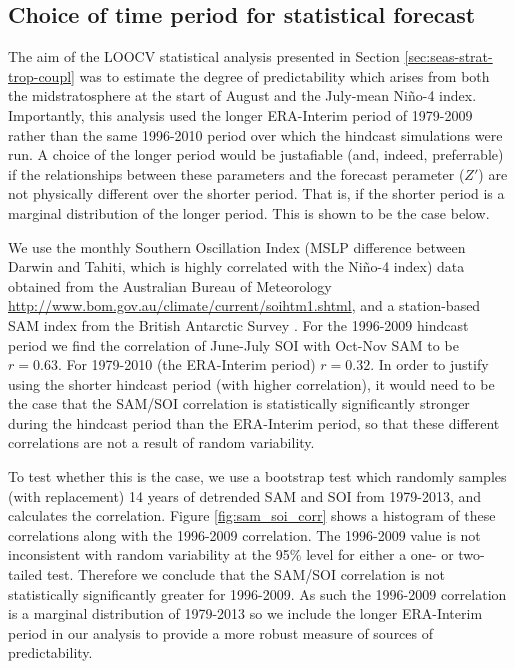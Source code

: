 \begin{subappendices}
\section{Choice of time period for statistical forecast}
\label{sec:app-choice-time-period}

The aim of the LOOCV statistical analysis presented in Section
\ref{sec:seas-strat-trop-coupl} was to estimate the degree of predictability
which arises from both the midstratosphere at the start of August and the
July-mean Ni\~no-4 index. Importantly, this analysis used the longer ERA-Interim
period of 1979-2009 rather than the same 1996-2010 period over which the
hindcast simulations were run. A choice of the longer period would be
justafiable (and, indeed, preferrable) if the relationships between these
parameters and the forecast perameter ($Z'$) are not physically different over
the shorter period. That is, if the shorter period is a marginal distribution of
the longer period. This is shown to be the case below.

We use the monthly Southern Oscillation Index (MSLP difference between Darwin
and Tahiti, which is highly correlated with the Ni\~no-4 index) data obtained
from the Australian Bureau of Meteorology
\url{http://www.bom.gov.au/climate/current/soihtm1.shtml}, and a station-based
SAM index from the British Antarctic Survey \citep{Marshall2003}. For the
1996-2009 hindcast period we find the correlation of June-July SOI with Oct-Nov
SAM to be $r=0.63$. For 1979-2010 (the ERA-Interim period) $r=0.32$. In order to
justify using the shorter hindcast period (with higher correlation), it would
need to be the case that the SAM/SOI correlation is statistically significantly
stronger during the hindcast period than the ERA-Interim period, so that these
different correlations are not a result of random variability.

To test whether this is the case, we use a bootstrap test which randomly samples
(with replacement) 14 years of detrended SAM and SOI from 1979-2013, and
calculates the correlation. Figure \ref{fig:sam_soi_corr} shows a histogram of
these correlations along with the 1996-2009 correlation. The 1996-2009 value is
not inconsistent with random variability at the 95\% level for either a one- or
two-tailed test. Therefore we conclude that the SAM/SOI correlation is not
statistically significantly greater for 1996-2009. As such the 1996-2009
correlation is a marginal distribution of 1979-2013 so we include the longer
ERA-Interim period in our analysis to provide a more robust measure of sources
of predictability. 


\end{subappendices}
